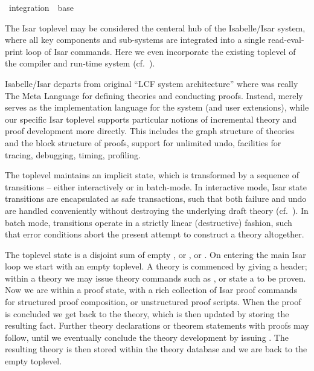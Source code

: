 %
\begin{isabellebody}%
\def\isabellecontext{integration}%
%
\isadelimtheory
\isanewline
\isanewline
\isanewline
%
\endisadelimtheory
%
\isatagtheory
{}\isamarkupfalse%
\ integration\ \ base\ %
\endisatagtheory
{\isafoldtheory}%
%
\isadelimtheory
%
\endisadelimtheory
%
\isamarkuptrue%
%
\isamarkuptrue%
%
\begin{isamarkuptext}%
The Isar toplevel may be considered the centeral hub of the
  Isabelle/Isar system, where all key components and sub-systems are
  integrated into a single read-eval-print loop of Isar commands.
  Here we even incorporate the existing {\ML} toplevel of the compiler
  and run-time system (cf.\ ).

  Isabelle/Isar departs from original ``LCF system architecture''
  where {\ML} was really The Meta Language for defining theories and
  conducting proofs.  Instead, {\ML} merely serves as the
  implementation language for the system (and user extensions), while
  our specific Isar toplevel supports particular notions of
  incremental theory and proof development more directly.  This
  includes the graph structure of theories and the block structure of
  proofs, support for unlimited undo, facilities for tracing,
  debugging, timing, profiling.

  \medskip The toplevel maintains an implicit state, which is
  transformed by a sequence of transitions -- either interactively or
  in batch-mode.  In interactive mode, Isar state transitions are
  encapsulated as safe transactions, such that both failure and undo
  are handled conveniently without destroying the underlying draft
  theory (cf.~).  In batch mode,
  transitions operate in a strictly linear (destructive) fashion, such
  that error conditions abort the present attempt to construct a
  theory altogether.

  The toplevel state is a disjoint sum of empty , or
  , or .  On entering the main Isar loop we
  start with an empty toplevel.  A theory is commenced by giving a
  \isa{{\isasymTHEORY}} header; within a theory we may issue theory
  commands such as \isa{{\isasymDEFINITION}}, or state a \isa{{\isasymTHEOREM}} to be proven.  Now we are within a proof state, with a
  rich collection of Isar proof commands for structured proof
  composition, or unstructured proof scripts.  When the proof is
  concluded we get back to the theory, which is then updated by
  storing the resulting fact.  Further theory declarations or theorem
  statements with proofs may follow, until we eventually conclude the
  theory development by issuing \isa{{\isasymEND}}.  The resulting theory
  is then stored within the theory database and we are back to the
  empty toplevel.


\end{isamarkuptext}
\end{isabellebody}
